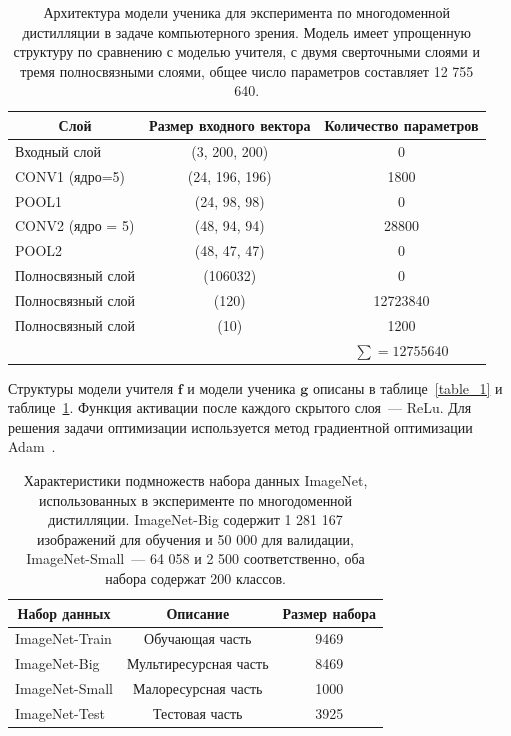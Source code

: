 \begin{table}[h!t]
\begin{center}
\caption{Архитектура модели ученика для эксперимента по многодоменной дистилляции в задаче компьютерного зрения. Модель имеет упрощенную структуру по сравнению с моделью учителя, с двумя сверточными слоями и тремя полносвязными слоями, общее число параметров составляет 12 755 640.}
\label{table_1_1}
\begin{tabular}{|c|c|c|}
\hline
	Слой & Размер входного вектора & Количество параметров\\
	\hline
	\multicolumn{1}{|l|}{Входный слой}
	& (3, 200, 200) & 0 \\
	\hline
	\multicolumn{1}{|l|}{CONV1 (ядро=5)}
	& (24, 196, 196) & 1800 \\
	\hline
	\multicolumn{1}{|l|}{POOL1}
	& (24, 98, 98) & 0 \\
	\hline
	\multicolumn{1}{|l|}{CONV2 (ядро = 5)}
	& (48, 94, 94) & 28800 \\
	\hline
	\multicolumn{1}{|l|}{POOL2}
	& (48, 47, 47) & 0 \\
	\hline
	\multicolumn{1}{|l|}{Полносвязный слой}
	& (106032) & 0 \\
	\hline
	\multicolumn{1}{|l|}{Полносвязный слой}
	& (120) & 12723840 \\
	\hline
	\multicolumn{1}{|l|}{Полносвязный слой}
	& (10) & 1200 \\
	\hline
	\multicolumn{1}{|l|}{}
	& & $\sum=12755640$ \\
\hline
\end{tabular}
\end{center}
\end{table}

Структуры модели учителя $\mathbf{f}$ и модели ученика $\mathbf{g}$ описаны в таблице~\ref{table_1} и таблице~\ref{table_1_1}. Функция активации после каждого скрытого слоя~--- ReLu.
Для решения задачи оптимизации используется метод градиентной оптимизации Adam~\cite{adam2015}.

\begin{table}[h!t]
\begin{center}
\caption{Характеристики подмножеств набора данных ImageNet, использованных в эксперименте по многодоменной дистилляции. ImageNet-Big содержит 1 281 167 изображений для обучения и 50 000 для валидации, ImageNet-Small~--- 64 058 и 2 500 соответственно, оба набора содержат 200 классов.}
\label{table_2}
\begin{tabular}{|c|c|c|}
\hline
	Набор данных & Описание & Размер набора\\
	\hline
	\multicolumn{1}{|l|}{ImageNet-Train}
	& Обучающая часть& 9469\\
	\hline
	\multicolumn{1}{|l|}{ImageNet-Big}
	& Мультиресурсная часть& 8469\\
	\hline
	\multicolumn{1}{|l|}{ImageNet-Small}
	& Малоресурсная часть& 1000\\
	\hline
	\multicolumn{1}{|l|}{ImageNet-Test}
	& Тестовая часть& 3925\\
\hline
\end{tabular}
\end{center}
\end{table}

